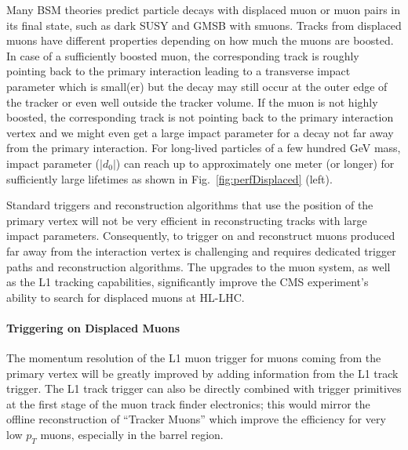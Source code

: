 Many BSM theories predict particle decays with displaced muon or muon pairs in its final state, such as dark SUSY and GMSB with smuons. 
Tracks from displaced muons have different properties depending on how much the muons are boosted. 
In case of a sufficiently boosted muon, the corresponding track is roughly pointing back to the primary interaction leading to a transverse impact parameter which is small(er) but the decay may still occur at the outer edge of the tracker or even well outside the tracker volume.
If the muon is not highly boosted, the corresponding track is not pointing back to the primary interaction vertex and we might even get a large impact parameter for a decay not far away from the primary interaction.
For long-lived particles of a few hundred GeV mass, impact parameter ($|d_0|$) can
reach up to approximately one meter (or longer) for sufficiently large
lifetimes as shown in Fig.~\ref{fig:perfDisplaced} (left).

Standard triggers and reconstruction algorithms that use the position of the primary vertex will not be very efficient in reconstructing tracks with large impact parameters.
Consequently, to trigger on and reconstruct muons produced far away from the interaction vertex is challenging and requires dedicated trigger paths and reconstruction algorithms. 
The upgrades to the muon system, as well as the L1 tracking capabilities, significantly improve the CMS experiment's ability to search for displaced muons at HL-LHC. 

\paragraph{Triggering on Displaced Muons}

The momentum resolution of the L1 muon trigger for muons coming from the primary vertex
will be greatly improved by adding information from the L1 track trigger. 
The L1 track trigger can also be directly combined with trigger primitives at the first stage of the muon
track finder electronics; this would mirror the offline reconstruction of ``Tracker Muons'' which
improve the efficiency for very low $p_T$ muons, especially in the barrel region.

